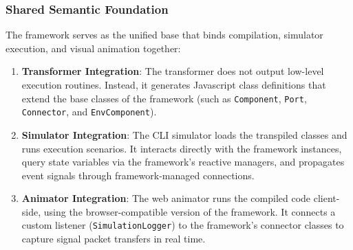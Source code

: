 \subsubsection{Shared Semantic Foundation}
The framework serves as the unified base that binds compilation, simulator execution, and visual animation together:
\begin{enumerate}
    \item \textbf{Transformer Integration}: The transformer does not output low-level execution routines. Instead, it generates Javascript class definitions that extend the base classes of the framework (such as \texttt{Component}, \texttt{Port}, \texttt{Connector}, and \texttt{EnvComponent}).
    \item \textbf{Simulator Integration}: The CLI simulator loads the transpiled classes and runs execution scenarios. It interacts directly with the framework instances, query state variables via the framework's reactive managers, and propagates event signals through framework-managed connections.
    \item \textbf{Animator Integration}: The web animator runs the compiled code client-side, using the browser-compatible version of the framework. It connects a custom listener (\texttt{SimulationLogger}) to the framework's connector classes to capture signal packet transfers in real time.
\end{enumerate}

